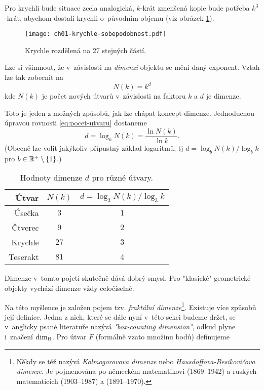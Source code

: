 Pro krychli bude situace zcela analogická, $k$-krát zmenšená kopie bude potřeba $k^3$-krát, abychom dostali krychli o~původním objemu (viz obrázek \ref{fig:krychle-sobepodobnost}).
\begin{figure}[h]
    \centering
    \texttt{[image: ch01-krychle-sobepodobnost.pdf]}
    \caption{Krychle rozdělená na 27 stejných částí.}
    \label{fig:krychle-sobepodobnost}
\end{figure}
Lze si všimnout, že v~závislosti na \emph{dimenzi} objektu se mění daný exponent. Vztah lze tak zobecnit na
\begin{equation}\label{eq:pocet-utvaru}
    N(k)=k^d
\end{equation}
kde $N(k)$ je počet nových útvarů v~závislosti na faktoru $k$ a $d$ je dimenze.\par
Toto je jeden z možných způsobů, jak lze chápat koncept dimenze. Jednoduchou úpravou rovnosti \eqref{eq:pocet-utvaru} dostaneme
\[d=\log_k{N(k)}=\dfrac{\ln{N(k)}}{\ln{k}}.\]
(Obecně lze volit jakýkoliv přípustný základ logaritmů, tj $d=\log_b{N(k)}/\log_b{k}$ pro $b\in\mathbb{R}^+\setminus\left\{1\right\}$.)
\begin{table}[h]
    \centering
    \begin{tabular}{r|cc}
    Útvar    & $N(k)$ & $d=\log_3{N(k)}/\log_3{k}$ \\ \hline
    Úsečka   & $3$      & $1$                          \\
    Čtverec  & $9$      & $2$                          \\
    Krychle  & $27$     & $3$                          \\
    Teserakt & $81$     & $4$                          \\
    \end{tabular}
    \caption{Hodnoty dimenze $d$ pro různé útvary.}
    \label{table:eukleides-dimenze}
\end{table}
Dimenze v~tomto pojetí skutečně dává dobrý smysl. Pro "klasické" geometrické objekty vychází dimenze vždy celočíselně.\par
Na této myšlence je založen pojem tzv. \emph{fraktální dimenze}\footnote{Někdy se též nazývá \emph{Kolmogorovova dimenze} nebo \emph{Hausdoffova-Besikovičova dimenze}. Je pojmenována po německém matematikovi  (1869--1942) a ruských matematicích  (1903--1987) a  (1891--1970).}. Existuje více způsobů její definice. Jedna z nich, které se dále nyní v~této sekci budeme držet, se v~anglicky psané literatuře nazývá \emph{"box-counting dimension"}, odkud plyne i~značení $\operatorname{dim_B}$. Pro útvar $F$ (formálně vzato množinu bodů) definujeme 
